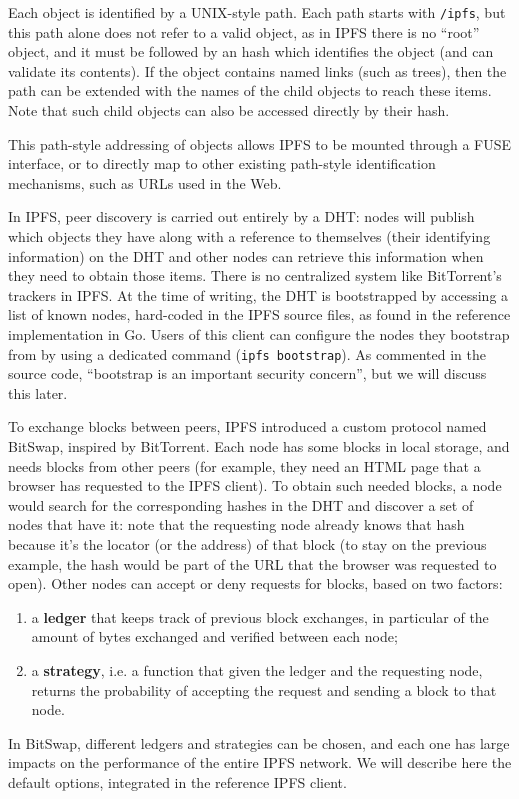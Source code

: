 \documentclass[mscthesis]{usiinfthesis}
\begin{document}
Each object is identified by a UNIX-style path. Each path starts with \texttt{/ipfs}, but this path alone does not refer to a valid object, as in IPFS there is no ``root'' object, and it must be followed by an hash which identifies the object (and can validate its contents). If the object contains named links (such as trees), then the path can be extended with the names of the child objects to reach these items. Note that such child objects can also be accessed directly by their hash.

This path-style addressing of objects allows IPFS to be mounted through a FUSE interface, or to directly map to other existing path-style identification mechanisms, such as URLs used in the Web.

In IPFS, peer discovery is carried out entirely by a DHT: nodes will publish which objects they have along with a reference to themselves (their identifying information) on the DHT and other nodes can retrieve this information when they need to obtain those items. There is no centralized system like BitTorrent's trackers in IPFS.
At the time of writing, the DHT is bootstrapped by accessing a list of known nodes, hard-coded in the IPFS source files, as found in the reference implementation in Go. Users of this client can configure the nodes they bootstrap from by using a dedicated command (\texttt{ipfs bootstrap}). As commented in the source code, ``bootstrap is an important security concern'', but we will discuss this later.

To exchange blocks between peers, IPFS introduced a custom protocol named BitSwap, inspired by BitTorrent. Each node has some blocks in local storage, and needs blocks from other peers (for example, they need an HTML page that a browser has requested to the IPFS client). To obtain such needed blocks, a node would search for the corresponding hashes in the DHT and discover a set of nodes that have it: note that the requesting node already knows that hash because it's the locator (or the address) of that block (to stay on the previous example, the hash would be part of the URL that the browser was requested to open). Other nodes can accept or deny requests for blocks, based on two factors:
\begin{enumerate}
	\item a \textbf{ledger} that keeps track of previous block exchanges, in particular of the amount of bytes exchanged and verified between each node;
	\item a \textbf{strategy}, i.e. a function that given the ledger and the requesting node, returns the probability of accepting the request and sending a block to that node.
\end{enumerate}
In BitSwap, different ledgers and strategies can be chosen, and each one has large impacts on the performance of the entire IPFS network. We will describe here the default options, integrated in the reference IPFS client.
\end{document}
